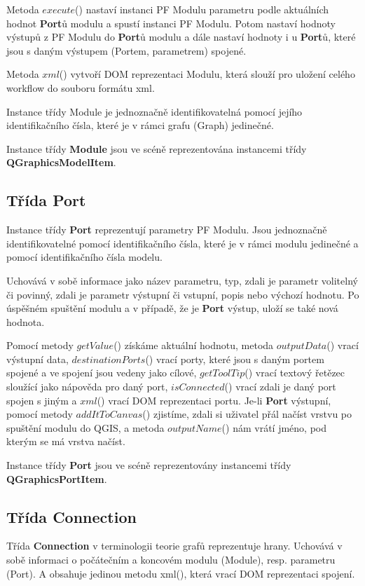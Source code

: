 Metoda $execute$() nastaví instanci PF Modulu parametru podle
aktuálních hodnot \textbf{Port}ů modulu a spustí instanci PF
Modulu. Potom nastaví hodnoty výstupů z PF Modulu do \textbf{Port}ů
modulu a dále nastaví hodnoty i u \textbf{Port}ů, které jsou s daným
výstupem (Portem, parametrem) spojené.

Metoda $xml$() vytvoří DOM reprezentaci Modulu, která slouží pro
uložení celého workflow do souboru formátu xml.

Instance třídy Module je jednoznačně identifikovatelná pomocí jejího
identifikačního čísla, které je v rámci grafu (Graph) jedinečné.

Instance třídy \textbf{Module} jsou ve scéně reprezentována instancemi
třídy \textbf{QGraphicsModelItem}.

\subsection*{Třída Port}  
Instance třídy \textbf{Port} reprezentují parametry PF Modulu. Jsou
jednoznačně identifikovatelné pomocí identifikačního čísla, které je v
rámci modulu jedinečné a pomocí identifikačního čísla modelu.

Uchovává v sobě informace jako název parametru, typ, zdali je parametr
volitelný či povinný, zdali je parametr výstupní či vstupní, popis
nebo výchozí hodnotu. Po úspěšném spuštění modulu a v případě, že
je \textbf{Port} výstup, uloží se také nová hodnota.

Pomocí metody $getValue$() získáme aktuální hodnotu, metoda
$outputData$() vrací výstupní data, $destinationPorts$() vrací porty,
které jsou s daným portem spojené a ve spojení jsou vedeny jako
cílové, $getToolTip$() vrací textový řetězec sloužící jako nápověda
pro daný port, $isConnected$() vrací zdali je daný port spojen s jiným
a $xml$() vrací DOM reprezentaci portu. Je-li \textbf{Port} výstupní,
pomocí metody $addItToCanvas$() zjistíme, zdali si uživatel přál
načíst vrstvu po spuštění modulu do QGIS, a metoda $outputName$() nám
vrátí jméno, pod kterým se má vrstva načíst.

Instance třídy \textbf{Port} jsou ve scéně reprezentovány instancemi
třídy \textbf{QGraphicsPortItem}.

\subsection*{Třída Connection}
Třída \textbf{Connection} v terminologii teorie grafů reprezentuje
hrany. Uchovává v sobě informaci o počátečním a koncovém modulu
(Module), resp. parametru (Port). A obsahuje jedinou metodu xml(),
která vrací DOM reprezentaci spojení.

